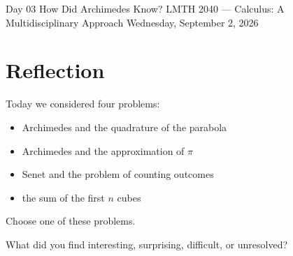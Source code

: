 \documentclass[11pt]{article}
\begin{document}
\courseheader
  {Day 03}
  {How Did Archimedes Know?}
  {LMTH 2040 --- Calculus: A Multidisciplinary Approach}
  {Wednesday, September 2, 2026}

\section*{Reflection}

Today we considered four problems:

\begin{itemize}
    \item Archimedes and the quadrature of the parabola
    \item Archimedes and the approximation of $\pi$
    \item Senet and the problem of counting outcomes
    \item the sum of the first $n$ cubes
\end{itemize}

Choose one of these problems.

What did you find interesting, surprising, difficult, or unresolved?

\vspace{4.5in}
\end{document}
